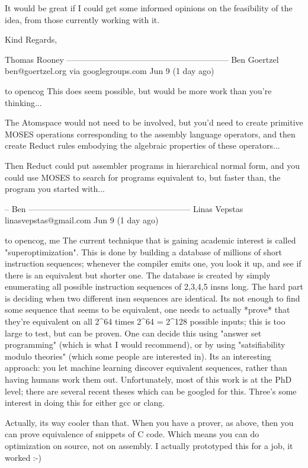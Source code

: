 \documentclass[11pt]{article}
\begin{document}
It would be great if I could get some informed opinions on the feasibility of the idea, from those currently working with it.

Kind Regards,

Thomas Rooney
-----------------------------------------------------------
Ben Goertzel ben@goertzel.org via googlegroups.com 
Jun 9 (1 day ago)

to opencog 
This does seem possible, but would be more work than you're thinking...

The Atomspace would not need to be involved, but you'd need to create
primitive MOSES operations corresponding to the assembly language
operators, and then create Reduct rules embodying the algebraic
properties of these operators...

Then Reduct could put assembler programs in hierarchical normal form,
and you could use MOSES to search for programs equivalent to, but
faster than, the program you started with...

-- Ben
-----------------------------------------------------------
Linas Vepstas linasvepstas@gmail.com
Jun 9 (1 day ago)

to opencog, me 
The current technique that is gaining academic interest is called "superoptimization".    This is done by building a database of millions of short instruction sequences; whenever the compiler emits one, you look it up, and see if there is an equivalent but shorter one.  The database is created by simply enumerating all possible instruction sequences of 2,3,4,5 insns long.  The hard part is deciding when two different insn sequences are identical.  Its not enough to find some sequence that seems to be equivalent, one needs to actually *prove* that they're equivalent on all 2^64 times 2^64 = 2^128 possible inputs; this is too large to test, but can be proven.   One can decide this using "answer set programming" (which is what I would recommend), or by using "satsifiability modulo theories" (which some people are interested in).   Its an interesting approach: you let machine learning discover equivalent sequences, rather than having humans work them out.  Unfortunately, most of this work is at the PhD level; there are several recent theses which can be googled for this.   Three's some interest in doing this for either gcc or clang.

Actually, its way cooler than that. When you have a prover, as above, then you can prove equivalence of snippets of C code.  Which means you can do optimization on source, not on assembly.  I actually prototyped this for a job, it worked :-)
\end{document}

